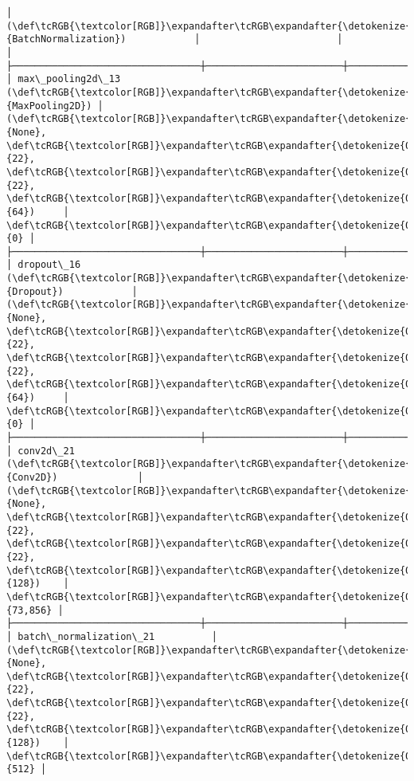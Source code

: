 \documentclass[11pt]{article}
\begin{document}
\begin{Verbatim}[commandchars=\\\{\}]
│ (\def\tcRGB{\textcolor[RGB]}\expandafter\tcRGB\expandafter{\detokenize{0,135,255}}{BatchNormalization})            │                        │               │
├─────────────────────────────────┼────────────────────────┼───────────────┤
│ max\_pooling2d\_13 (\def\tcRGB{\textcolor[RGB]}\expandafter\tcRGB\expandafter{\detokenize{0,135,255}}{MaxPooling2D}) │ (\def\tcRGB{\textcolor[RGB]}\expandafter\tcRGB\expandafter{\detokenize{0,215,255}}{None}, \def\tcRGB{\textcolor[RGB]}\expandafter\tcRGB\expandafter{\detokenize{0,175,0}}{22}, \def\tcRGB{\textcolor[RGB]}\expandafter\tcRGB\expandafter{\detokenize{0,175,0}}{22}, \def\tcRGB{\textcolor[RGB]}\expandafter\tcRGB\expandafter{\detokenize{0,175,0}}{64})     │             \def\tcRGB{\textcolor[RGB]}\expandafter\tcRGB\expandafter{\detokenize{0,175,0}}{0} │
├─────────────────────────────────┼────────────────────────┼───────────────┤
│ dropout\_16 (\def\tcRGB{\textcolor[RGB]}\expandafter\tcRGB\expandafter{\detokenize{0,135,255}}{Dropout})            │ (\def\tcRGB{\textcolor[RGB]}\expandafter\tcRGB\expandafter{\detokenize{0,215,255}}{None}, \def\tcRGB{\textcolor[RGB]}\expandafter\tcRGB\expandafter{\detokenize{0,175,0}}{22}, \def\tcRGB{\textcolor[RGB]}\expandafter\tcRGB\expandafter{\detokenize{0,175,0}}{22}, \def\tcRGB{\textcolor[RGB]}\expandafter\tcRGB\expandafter{\detokenize{0,175,0}}{64})     │             \def\tcRGB{\textcolor[RGB]}\expandafter\tcRGB\expandafter{\detokenize{0,175,0}}{0} │
├─────────────────────────────────┼────────────────────────┼───────────────┤
│ conv2d\_21 (\def\tcRGB{\textcolor[RGB]}\expandafter\tcRGB\expandafter{\detokenize{0,135,255}}{Conv2D})              │ (\def\tcRGB{\textcolor[RGB]}\expandafter\tcRGB\expandafter{\detokenize{0,215,255}}{None}, \def\tcRGB{\textcolor[RGB]}\expandafter\tcRGB\expandafter{\detokenize{0,175,0}}{22}, \def\tcRGB{\textcolor[RGB]}\expandafter\tcRGB\expandafter{\detokenize{0,175,0}}{22}, \def\tcRGB{\textcolor[RGB]}\expandafter\tcRGB\expandafter{\detokenize{0,175,0}}{128})    │        \def\tcRGB{\textcolor[RGB]}\expandafter\tcRGB\expandafter{\detokenize{0,175,0}}{73,856} │
├─────────────────────────────────┼────────────────────────┼───────────────┤
│ batch\_normalization\_21          │ (\def\tcRGB{\textcolor[RGB]}\expandafter\tcRGB\expandafter{\detokenize{0,215,255}}{None}, \def\tcRGB{\textcolor[RGB]}\expandafter\tcRGB\expandafter{\detokenize{0,175,0}}{22}, \def\tcRGB{\textcolor[RGB]}\expandafter\tcRGB\expandafter{\detokenize{0,175,0}}{22}, \def\tcRGB{\textcolor[RGB]}\expandafter\tcRGB\expandafter{\detokenize{0,175,0}}{128})    │           \def\tcRGB{\textcolor[RGB]}\expandafter\tcRGB\expandafter{\detokenize{0,175,0}}{512} │

\end{Verbatim}
\end{document}
